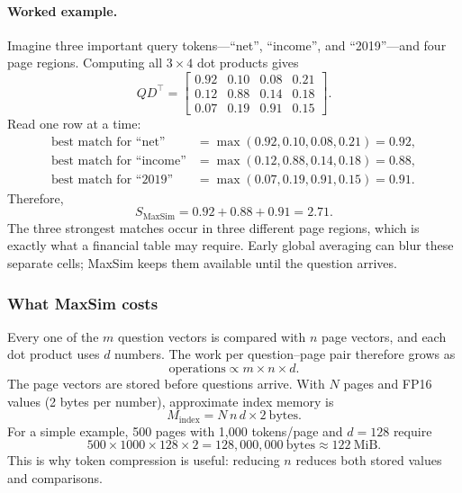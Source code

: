 \documentclass[11pt,a4paper]{article}
\begin{document}
\paragraph{Worked example.} Imagine three important query tokens---``net'', ``income'', and ``2019''---and four page regions. Computing all $3\times4$ dot products gives
\begin{equation}
QD^\top=
\begin{bmatrix}
0.92&0.10&0.08&0.21\\
0.12&0.88&0.14&0.18\\
0.07&0.19&0.91&0.15
\end{bmatrix}.
\end{equation}
Read one row at a time:
\begin{align}
\text{best match for ``net''}    &=\max(0.92,0.10,0.08,0.21)=0.92,\\
\text{best match for ``income''} &=\max(0.12,0.88,0.14,0.18)=0.88,\\
\text{best match for ``2019''}   &=\max(0.07,0.19,0.91,0.15)=0.91.
\end{align}
Therefore,
\begin{equation}
S_{\mathrm{MaxSim}}=0.92+0.88+0.91=2.71.
\end{equation}
The three strongest matches occur in three different page regions, which is exactly what a financial table may require. Early global averaging can blur these separate cells; MaxSim keeps them available until the question arrives.

\subsubsection*{What MaxSim costs}

Every one of the $m$ question vectors is compared with $n$ page vectors, and each dot product uses $d$ numbers. The work per question--page pair therefore grows as
\begin{equation}
\text{operations}\propto m\times n\times d.
\end{equation}
The page vectors are stored before questions arrive. With $N$ pages and FP16 values (2 bytes per number), approximate index memory is
\begin{equation}
M_{\mathrm{index}}=N\,n\,d\times 2\ \text{bytes}.
\label{eq:memory}
\end{equation}
For a simple example, 500 pages with 1,000 tokens/page and $d=128$ require
\begin{equation}
500\times1000\times128\times2=128{,}000{,}000\ \text{bytes}\approx122\ \text{MiB}.
\end{equation}
This is why token compression is useful: reducing $n$ reduces both stored values and comparisons.
\end{document}
